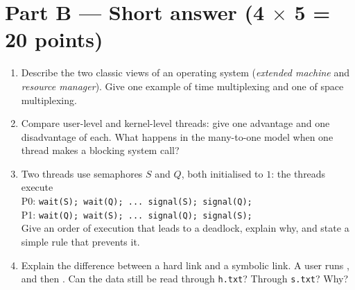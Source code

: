 \section*{Part B --- Short answer \hfill (4 $\times$ 5 = 20 points)}
\begin{enumerate}[leftmargin=2.0em,label=B\arabic*.,itemsep=0.3em]
  \item Describe the two classic views of an operating system (\emph{extended machine} and \emph{resource manager}). Give one example of time multiplexing and one of space multiplexing. 
  \ans{2.7cm}
  \item Compare user-level and kernel-level threads: give one advantage and one disadvantage of each. What happens in the many-to-one model when one thread makes a blocking system call? 
  \ans{2.7cm}
  \item Two threads use semaphores $S$ and $Q$, both initialised to $1$: the threads execute\\[0.2em]
  \hspace*{1em}P0: \texttt{wait(S); wait(Q); ... signal(S); signal(Q);}\\
  \hspace*{1em}P1: \texttt{wait(Q); wait(S); ... signal(Q); signal(S);}\\[0.2em]
  Give an order of execution that leads to a deadlock, explain why, and state a simple rule that prevents it. 
  \ans{2.7cm}
  \item Explain the difference between a hard link and a symbolic link. A user runs ,  and then . Can the data still be read through \texttt{h.txt}? Through \texttt{s.txt}? Why? 
  \ans{2.7cm}
\end{enumerate}

\newpage
